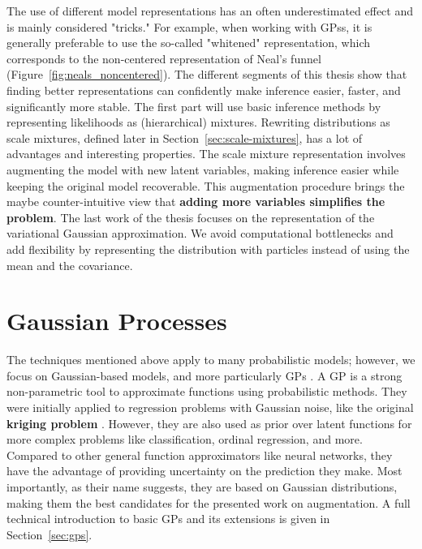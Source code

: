 The use of different model representations has an often underestimated effect and is mainly considered "tricks."
For example, when working with \aclp{GPs}, it is generally preferable to use the so-called "whitened" representation, which corresponds to the non-centered representation of Neal's funnel (Figure~\ref{fig:neals_noncentered}).
The different segments of this thesis show that finding better representations can confidently make inference easier, faster, and significantly more stable. 
The first part will use basic inference methods by representing likelihoods as (hierarchical) mixtures.
Rewriting distributions as scale mixtures, defined later in Section~\ref{sec:scale-mixtures}, has a lot of advantages and interesting properties.
The scale mixture representation involves augmenting the model with new latent variables, making inference easier while keeping the original model recoverable.
This augmentation procedure brings the maybe counter-intuitive view that \textbf{adding more variables simplifies the problem}.
The last work of the thesis focuses on the representation of the variational Gaussian approximation.
We avoid computational bottlenecks and add flexibility by representing the distribution with particles instead of using the mean and the covariance.

\section{Gaussian Processes}

The techniques mentioned above apply to many probabilistic models; however, we focus on Gaussian-based models, and more particularly \acp{GP} \cite{rasmussen2006gaussian}.
A \ac{GP} is a strong non-parametric tool to approximate functions using probabilistic methods.
They were initially applied to regression problems with Gaussian noise, like the original \textbf{kriging problem} \cite{cressie1990origins}.
However, they are also used as prior over latent functions for more complex problems like classification, ordinal regression, and more.
Compared to other general function approximators like neural networks, they have the advantage of providing uncertainty on the prediction they make.
Most importantly, as their name suggests, they are based on Gaussian distributions, making them the best candidates for the presented work on augmentation.
A full technical introduction to basic \acp{GP} and its extensions is given in Section~\ref{sec:gps}.


